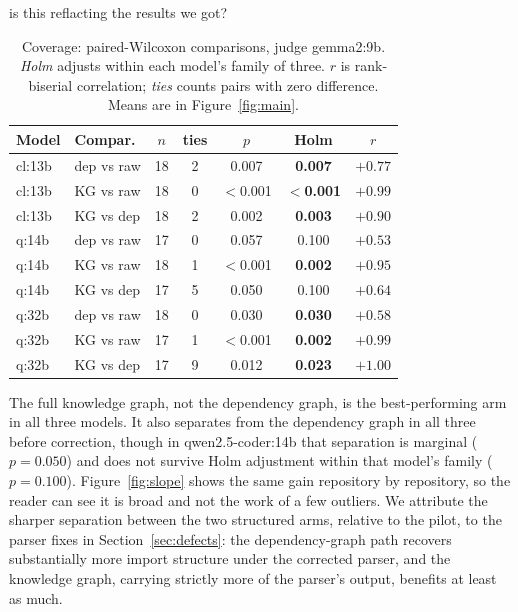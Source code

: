 is this reflacting the results we got?\documentclass[conference]{IEEEtran}
\begin{document}
\begin{table}[htbp]
\caption{Coverage: paired-Wilcoxon comparisons, judge gemma2:9b. \emph{Holm} adjusts within each
model's family of three. $r$ is rank-biserial correlation; \emph{ties} counts pairs with zero
difference. Means are in Figure~\ref{fig:main}.}
\label{tab:coverage}
\centering
\footnotesize
\begin{tabular}{@{}p{0.85cm}p{1.25cm}ccccc@{}}
\toprule
Model & Compar. & $n$ & ties & $p$ & Holm & $r$ \\
\midrule
cl:13b & dep vs raw & 18 & 2 & 0.007 & \textbf{0.007} & $+0.77$ \\
cl:13b & KG vs raw & 18 & 0 & $<$0.001 & \textbf{$<$0.001} & $+0.99$ \\
cl:13b & KG vs dep & 18 & 2 & 0.002 & \textbf{0.003} & $+0.90$ \\
q:14b & dep vs raw & 17 & 0 & 0.057 & 0.100 & $+0.53$ \\
q:14b & KG vs raw & 18 & 1 & $<$0.001 & \textbf{0.002} & $+0.95$ \\
q:14b & KG vs dep & 17 & 5 & 0.050 & 0.100 & $+0.64$ \\
q:32b & dep vs raw & 18 & 0 & 0.030 & \textbf{0.030} & $+0.58$ \\
q:32b & KG vs raw & 17 & 1 & $<$0.001 & \textbf{0.002} & $+0.99$ \\
q:32b & KG vs dep & 17 & 9 & 0.012 & \textbf{0.023} & $+1.00$ \\
\bottomrule
\end{tabular}
\end{table}

The full knowledge graph, not the dependency graph, is the best-performing arm in all three
models. It also separates from the dependency graph in all three before correction, though in
qwen2.5-coder:14b that separation is marginal ($p=0.050$) and does not survive Holm adjustment
within that model's family ($p=0.100$). Figure~\ref{fig:slope} shows the same gain repository by
repository, so the reader can see it is broad and not the work of a few outliers. We attribute
the sharper separation between the two structured arms, relative to the pilot, to the parser
fixes in Section~\ref{sec:defects}: the dependency-graph path recovers substantially more import
structure under the corrected parser, and the knowledge graph, carrying strictly more of the
parser's output, benefits at least as much.
\end{document}

